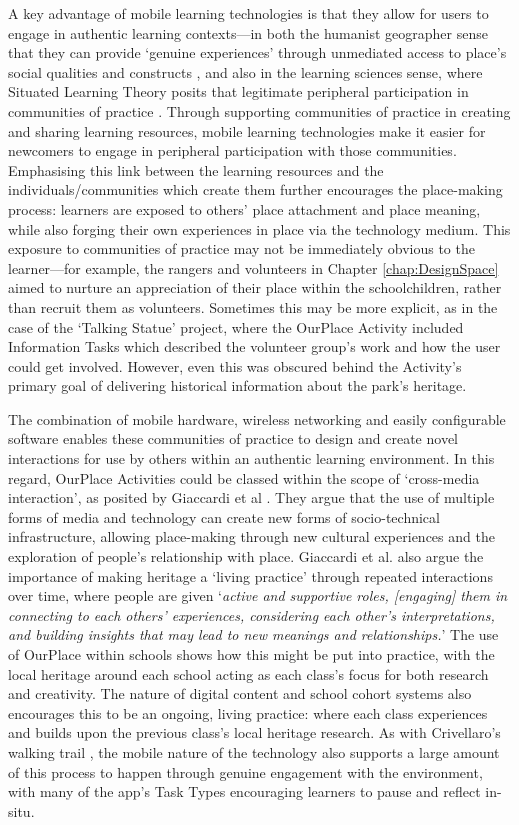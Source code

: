 A key advantage of mobile learning technologies is that they allow for users to engage in authentic learning contexts---in both the humanist geographer sense that they can provide `genuine experiences' through unmediated access to place's social qualities and constructs \citep{Relph1976}, and also in the learning sciences sense, where Situated Learning Theory posits that legitimate peripheral participation in communities of practice \citep{lave1991situated}. Through supporting communities of practice in creating and sharing learning resources, mobile learning technologies make it easier for newcomers to engage in peripheral participation with those communities. Emphasising this link between the learning resources and the individuals/communities which create them further encourages the place-making process: learners are exposed to others' place attachment and place meaning, while also forging their own experiences in place via the technology medium. This exposure to communities of practice may not be immediately obvious to the learner---for example, the rangers and volunteers in Chapter \ref{chap:DesignSpace} aimed to nurture an appreciation of their place within the schoolchildren, rather than recruit them as volunteers. Sometimes this may be more explicit, as in the case of the `Talking Statue' project, where the OurPlace Activity included Information Tasks which described the volunteer group's work and how the user could get involved. However, even this was obscured behind the Activity's primary goal of delivering historical information about the park's heritage.

The combination of mobile hardware, wireless networking and easily configurable software enables these communities of practice to design and create novel interactions for use by others within an authentic learning environment. In this regard, OurPlace Activities could be classed within the scope of `cross-media interaction', as posited by Giaccardi et al \citep{Giaccardi2008}. They argue that the use of multiple forms of media and technology can create new forms of socio-technical infrastructure, allowing place-making through new cultural experiences and the exploration of people's relationship with place. Giaccardi et al. also argue the importance of making heritage a `living practice' through repeated interactions over time, where people are given `\textit{active and supportive roles, [engaging] them in connecting to each others’ experiences, considering each other’s interpretations, and building insights that may lead to new meanings and relationships.}' The use of OurPlace within schools shows how this might be put into practice, with the local heritage around each school acting as each class's focus for both research and creativity. The nature of digital content and school cohort systems also encourages this to be an ongoing, living practice: where each class experiences and builds upon the previous class's local heritage research. As with Crivellaro's walking trail \citep{Crivellaro2016}, the mobile nature of the technology also supports a large amount of this process to happen through genuine engagement with the environment, with many of the app's Task Types encouraging learners to pause and reflect in-situ.

